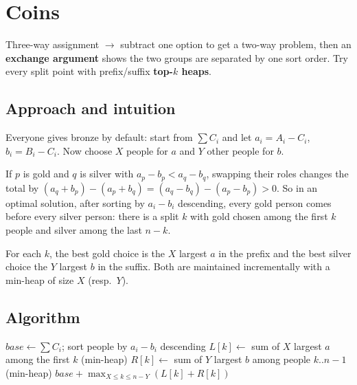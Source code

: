 \section{Coins}
\label{sec:g-coins}


\begin{patternbox}
Three-way assignment $\to$ subtract one option to get a two-way problem, then
an \textbf{exchange argument} shows the two groups are separated by one sort
order. Try every split point with prefix/suffix \textbf{top-$k$ heaps}.
\end{patternbox}

\subsection*{Approach and intuition}

Everyone gives bronze by default: start from $\sum C_i$ and let $a_i=A_i-C_i$,
$b_i=B_i-C_i$. Now choose $X$ people for $a$ and $Y$ other people for $b$.

\begin{ideabox}
If $p$ is gold and $q$ is silver with $a_p-b_p<a_q-b_q$, swapping their roles
changes the total by $(a_q+b_p)-(a_p+b_q)=(a_q-b_q)-(a_p-b_p)>0$. So in an
optimal solution, after sorting by $a_i-b_i$ descending, every gold person
comes before every silver person: there is a split $k$ with gold chosen among
the first $k$ people and silver among the last $n-k$.
\end{ideabox}

For each $k$, the best gold choice is the $X$ largest $a$ in the prefix and
the best silver choice the $Y$ largest $b$ in the suffix. Both are maintained
incrementally with a min-heap of size $X$ (resp.\ $Y$).

\subsection*{Algorithm}
\begin{algorithmic}[1]
\State $base\gets\sum C_i$; sort people by $a_i-b_i$ descending
\State $L[k]\gets$ sum of $X$ largest $a$ among the first $k$ (min-heap)
\State $R[k]\gets$ sum of $Y$ largest $b$ among people $k..n-1$ (min-heap)
\State \Return $base+\max_{X\le k\le n-Y}(L[k]+R[k])$
\end{algorithmic}

